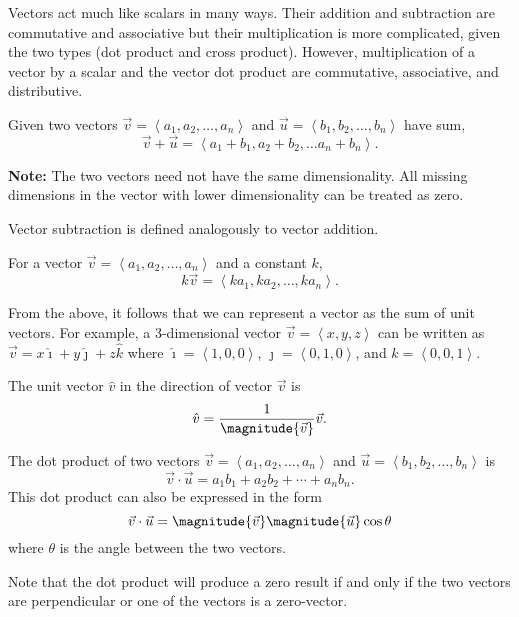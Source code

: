 \documentclass[12pt]{scrartcl}
\begin{document}
\begin{remark}
    Vectors act much like scalars in many ways. Their addition and subtraction are commutative and associative but their multiplication is more complicated, given the two types (dot product and cross product). However, multiplication of a vector by a scalar and the vector dot product are commutative, associative, and distributive.
\end{remark}

\begin{definition}
    Given two vectors $\vec{v} = \left<a_{1}, a_{2}, \dots, a_{n}\right>$ and $\vec{u} = \left<b_{1}, b_{2}, \dots, b_{n}\right>$ have sum,
    \[\vec{v} + \vec{u} = \left<a_{1} + b_{1}, a_{2} + b_{2}, \dots a_{n} + b_{n}\right>.\]

    \textbf{Note:} The two vectors need not have the same dimensionality. All missing dimensions in the vector with lower dimensionality can be treated as zero.
\end{definition}

\begin{definition}
    Vector subtraction is defined analogously to vector addition.
\end{definition}

\begin{definition}
    For a vector $\vec{v} = \left<a_{1}, a_{2}, \dots, a_{n}\right>$ and a constant $k$,
    \[k\vec{v} = \left<ka_{1}, ka_{2}, \dots, ka_{n}\right>.\]
\end{definition}

\begin{corollary}
    From the above, it follows that we can represent a vector as the sum of unit vectors. For example, a 3-dimensional vector $\vec{v} = \left<x, y, z\right>$ can be written as $\vec{v} = x\hat{\imath} + y\hat{\jmath} + z\hat{k}$ where $\hat{\imath} = \left<1, 0, 0\right>$, $\hat{\jmath} = \left<0, 1, 0\right>$, and $\hat{k} = \left<0, 0, 1\right>$.
\end{corollary}

\begin{definition}
    The unit vector $\hat{v}$ in the direction of vector $\vec{v}$ is
    \[\hat{v} = \frac{1}{\magnitude{\vec{v}}}\vec{v}.\]
\end{definition}

\begin{definition}
    The dot product of two vectors $\vec{v} = \left<a_{1}, a_{2}, \dots, a_{n}\right>$ and $\vec{u} = \left<b_{1}, b_{2}, \dots, b_{n}\right>$ is
    \[\vec{v} \cdot \vec{u} = a_{1}b_{1} + a_{2}b_{2} + \cdots + a_{n}b_{n}.\]
    This dot product can also be expressed in the form
    \[\vec{v} \cdot \vec{u} = \magnitude{\vec{v}}\magnitude{\vec{u}}\cos\theta\]
    where $\theta$ is the angle between the two vectors.
\end{definition}

\begin{remark}
    Note that the dot product will produce a zero result if and only if the two vectors are perpendicular or one of the vectors is a zero-vector.
\end{remark}
\end{document}
